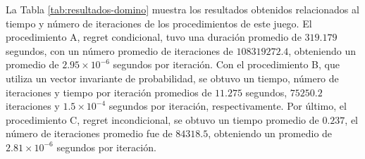 La Tabla \ref{tab:resultados-domino} muestra los resultados obtenidos relacionados al tiempo y número de iteraciones de los procedimientos de este juego. El procedimiento A, regret condicional, tuvo una duración promedio de $319.179$ segundos, con un número promedio de iteraciones de $108319272.4$, obteniendo un promedio de $2.95 {\times} 10^{-6}$ segundos por iteración. Con el procedimiento B, que utiliza un vector invariante de probabilidad, se obtuvo un tiempo, número de iteraciones y tiempo por iteración promedios de $11.275$ segundos, $75250.2$ iteraciones y $1.5 {\times} 10^{-4}$ segundos por iteración, respectivamente. Por último, el procedimiento C, regret incondicional, se obtuvo un tiempo promedio de $0.237$, el número de iteraciones promedio fue de $84318.5$, obteniendo un promedio de $2.81 {\times} 10^{-6}$ segundos por iteración. 

